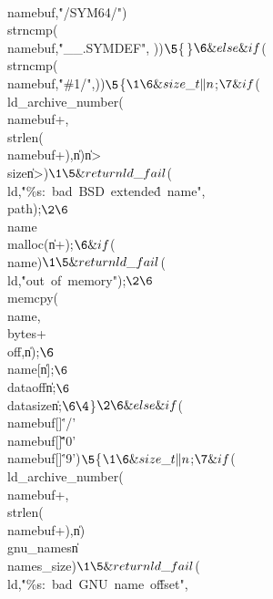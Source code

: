 \\{namebuf},\.{"/SYM64/"})\V\R\\{strncmp}(\\{namebuf},\.{"\_\_.SYMDEF"},%
)){}$\5
${}\{\,\}{}$\6
\&{else} \&{if} ${}(\R\\{strncmp}(\\{namebuf},\.{"\#1/"},)){}$\5
${}\{{}$\1\6
\&{size\_t} \|n${}\K{};{}$\7
\&{if} ${}(\R\\{ld\_archive\_number}(\\{namebuf}+,\\{strlen}(%
\\{namebuf}+),\|n)\V\|n>\\{size}\V\|n>){}$\1\5
\&{return} \\{ld\_fail}${}(\\{ld},\.{"\%s:\ bad\ BSD\ extende}\)\.{d\
name"},\\{path});{}$\2\6
${}\\{name}\K\\{malloc}(\|n+);{}$\6
\&{if} ${}(\R\\{name}){}$\1\5
\&{return} \\{ld\_fail}${}(\\{ld},\.{"out\ of\ memory"});{}$\2\6
${}\\{memcpy}(\\{name},\39\\{bytes}+\\{off},\39\|n);{}$\6
${}\\{name}[\|n]\K{};{}$\6
${}\\{dataoff}\MRL{+{\K}}\|n;{}$\6
${}\\{datasize}\MRL{-{\K}}\|n;{}$\6
\4${}\}{}$\2\6
\&{else} \&{if} ${}(\\{namebuf}[]\E\.{'/'}\W\\{namebuf}[]\G\.{'0'}\W%
\\{namebuf}[\T{1}]\Z\.{'9'}){}$\5
${}\{{}$\1\6
\&{size\_t} \|n${}\K{};{}$\7
\&{if} ${}(\R\\{ld\_archive\_number}(\\{namebuf}+,\\{strlen}(%
\\{namebuf}+\T{1}),{\AND}\|n)\V\R\\{gnu\_names}\V\|n\G\\{names\_size}){}$\1\5
\&{return} \\{ld\_fail}${}(\\{ld},\39\.{"\%s:\ bad\ GNU\ name\ of}\)\.{fset"},%
